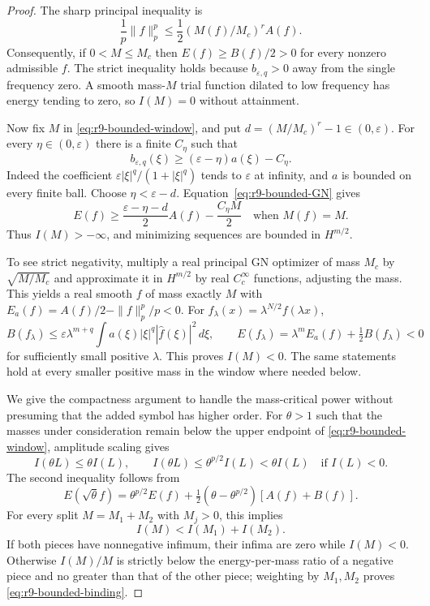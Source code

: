 \begin{proof}
The sharp principal inequality is
\begin{equation}\label{eq:r9-bounded-GN}
 \frac1p\|f\|_p^p\le
 \frac12(M(f)/M_c)^r A(f).
\end{equation}
Consequently, if $0<M\le M_c$ then $E(f)\ge B(f)/2>0$ for every
nonzero admissible $f$. The strict inequality holds because
$b_{\varepsilon,q}>0$ away from the single frequency zero. A smooth
mass-$M$ trial function dilated to low frequency has energy tending to
zero, so $I(M)=0$ without attainment.

Now fix $M$ in \eqref{eq:r9-bounded-window}, and put
$d=(M/M_c)^r-1\in(0,\varepsilon)$. For every
$\eta\in(0,\varepsilon)$ there is a finite $C_\eta$ such that
\[
 b_{\varepsilon,q}(\xi)\ge(\varepsilon-\eta)a(\xi)-C_\eta.
\]
Indeed the coefficient $\varepsilon|\xi|^q/(1+|\xi|^q)$ tends to
$\varepsilon$ at infinity, and $a$ is bounded on every finite ball.
Choose $\eta<\varepsilon-d$. Equation~\eqref{eq:r9-bounded-GN} gives
\begin{equation}\label{eq:r9-bounded-coercivity}
 E(f)\ge\frac{\varepsilon-\eta-d}{2}A(f)-\frac{C_\eta M}{2}
 \quad\text{when }M(f)=M.
\end{equation}
Thus $I(M)>-\infty$, and minimizing sequences are bounded in
$H^{m/2}$.

To see strict negativity, multiply a real principal GN optimizer of
mass $M_c$ by $\sqrt{M/M_c}$ and approximate it in $H^{m/2}$ by real
$C_c^\infty$ functions, adjusting the mass. This yields a real smooth
$f$ of mass exactly $M$ with
$E_a(f)=A(f)/2-\|f\|_p^p/p<0$.
For $f_\lambda(x)=\lambda^{N/2}f(\lambda x)$,
\[
 B(f_\lambda)\le\varepsilon\lambda^{m+q}
       \int a(\xi)|\xi|^q|\widehat f(\xi)|^2\,d\xi,
 \qquad E(f_\lambda)=\lambda^m E_a(f)+\tfrac12B(f_\lambda)<0
\]
for sufficiently small positive $\lambda$. This proves $I(M)<0$.
The same statements hold at every smaller positive mass in the window
where needed below.

We give the compactness argument to handle the mass-critical power
without presuming that the added symbol has higher order.
For $\theta>1$ such that the masses under consideration remain below
the upper endpoint of \eqref{eq:r9-bounded-window}, amplitude scaling
gives
\[
 I(\theta L)\le\theta I(L),\qquad
 I(\theta L)\le\theta^{p/2}I(L)<\theta I(L)
       \quad\text{if }I(L)<0.
\]
The second inequality follows from
\[
 E(\sqrt\theta f)=\theta^{p/2}E(f)
       +\tfrac12(\theta-\theta^{p/2})[A(f)+B(f)].
\]
For every split $M=M_1+M_2$ with $M_j>0$, this implies
\begin{equation}\label{eq:r9-bounded-binding}
 I(M)<I(M_1)+I(M_2).
\end{equation}
If both pieces have nonnegative infimum, their infima are zero while
$I(M)<0$. Otherwise $I(M)/M$ is strictly below the energy-per-mass
ratio of a negative piece and no greater than that of the other piece;
weighting by $M_1,M_2$ proves \eqref{eq:r9-bounded-binding}.


\end{proof}
